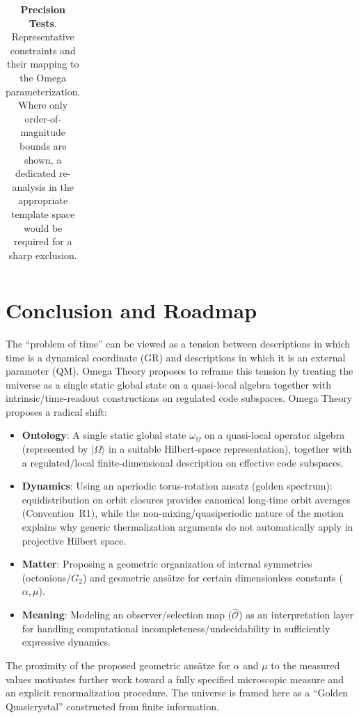 \begin{table}[ht]
\begin{tabular}{|p{3cm}|p{3cm}|p{4.5cm}|p{3.5cm}|}
    \hline
    \end{tabular}
    \caption{\textbf{Precision Tests}. Representative constraints and their mapping to the Omega parameterization. Where only order-of-magnitude bounds are shown, a dedicated re-analysis in the appropriate template space would be required for a sharp exclusion.}
    \label{tab:constraints}
\end{table}


\section{Conclusion and Roadmap}
\label{chap:conclusion}

The ``problem of time'' can be viewed as a tension between descriptions in which time is a dynamical coordinate (GR) and descriptions in which it is an external parameter (QM). Omega Theory proposes to reframe this tension by treating the universe as a single static global state on a quasi-local algebra together with intrinsic/time-readout constructions on regulated code subspaces.
Omega Theory proposes a radical shift:
\begin{itemize}
    \item \textbf{Ontology}: A single static global state $\omega_\Omega$ on a quasi-local operator algebra (represented by $|\Omega\rangle$ in a suitable Hilbert-space representation), together with a regulated/local finite-dimensional description on effective code subspaces.
    \item \textbf{Dynamics}: Using an aperiodic torus-rotation ansatz (golden spectrum): equidistribution on orbit closures provides canonical long-time orbit averages (Convention~R1), while the non-mixing/quasiperiodic nature of the motion explains why generic thermalization arguments do not automatically apply in projective Hilbert space.
    \item \textbf{Matter}: Proposing a geometric organization of internal symmetries (octonions/$G_2$) and geometric ans\"atze for certain dimensionless constants ($\alpha, \mu$).
    \item \textbf{Meaning}: Modeling an observer/selection map ($\hat{\mathcal{O}}$) as an interpretation layer for handling computational incompleteness/undecidability in sufficiently expressive dynamics.
\end{itemize}
The proximity of the proposed geometric ans\"atze for $\alpha$ and $\mu$ to the measured values motivates further work toward a fully specified microscopic measure and an explicit renormalization procedure. The universe is framed here as a ``Golden Quasicrystal'' constructed from finite information.

